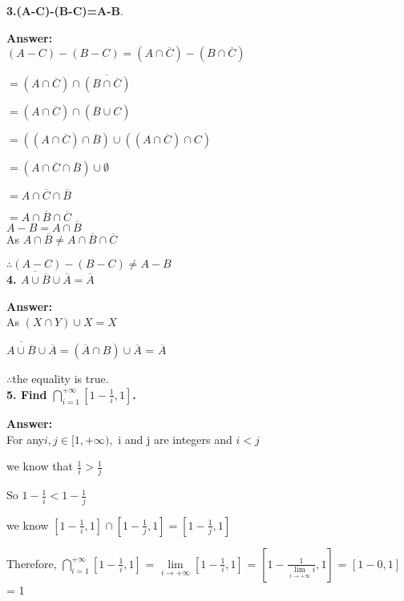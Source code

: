 \documentclass{article}
\begin{document}
\begin{large}
\textbf{3.(A-C)-(B-C)=A-B}.

\textbf{Answer:} \\

$(A-C)-(B-C) = (A \cap \overline{C}) - (B \cap \overline{C})$

            $= (A \cap \overline{C}) \cap \overline{(B \cap \overline{C})}$
            
            $= (A \cap \overline{C}) \cap (\overline{B} \cup C)$
            
            $= ((A \cap \overline{C}) \cap \overline{B}) \cup ((A \cap \overline{C}) \cap C)$
            
            $= (A \cap \overline{C} \cap \overline{B}) \cup \emptyset$
            
            $= A \cap \overline{C} \cap \overline{B}$
            
            $= A \cap \overline{B} \cap \overline{C}$\\

$A-B = A \cap \overline{B}$\\

As $A \cap \overline{B} \neq A \cap \overline{B} \cap \overline{C}$

$\therefore (A-C)-(B-C) \neq A-B$\\

\textbf{4. $\overline{A\cup \overline{B}} \cup \overline{A}=\overline{A}$}

\textbf{Answer:} \\

As $(X \cap Y) \cup X = X$

$\overline{A\cup \overline{B}} \cup \overline{A} = (\overline{A} \cap B) \cup \overline{A}$
                                                 = $\overline{A}$

$\therefore $the equality is true.\\

\textbf{5. Find $\bigcap\limits_{i=1}^{+\infty}[1-\frac{1}{i}, 1]$.}

\textbf{Answer:} \\


For any$ i, j \in [1, +\infty),$ i and j are integers and $i < j$
 
we know that $\frac{1}{i} > \frac{1}{j}$

So $1 - \frac{1}{i} < 1- \frac{1}{j}$

we know $[1 - \frac{1}{i}, 1] \cap [1 - \frac{1}{j},1] = [1 - \frac{1}{j},1]$

Therefore, $\bigcap\limits_{i=1}^{+\infty}[1-\frac{1}{i}, 1]$ = $\lim\limits_{i\to + \infty} [1 - \frac{1}{i},1]$
                                                              = $[1 - \frac{1}{\lim\limits_{i\to + \infty}i}, 1]$
                                                              = $[1 - 0, 1]$
                                                              = 1\\



\end{large}
\end{document}

